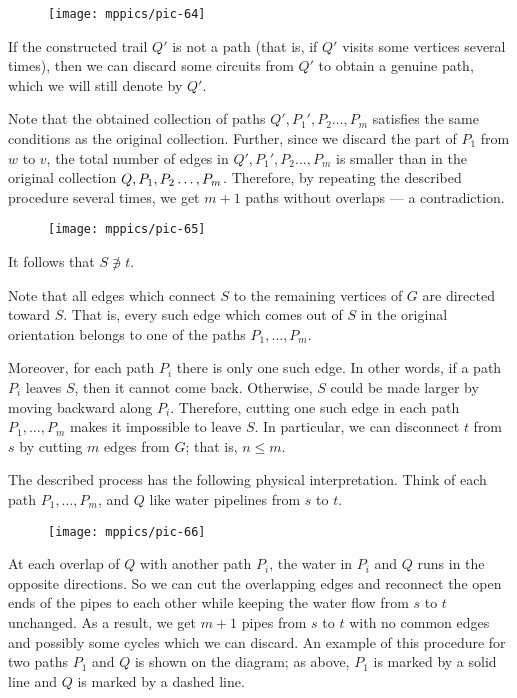 \begin{wrapfigure}{o}{30 mm}
\vskip-0mm
\centering
\texttt{[image: mppics/pic-64]}
\vskip0mm
\end{wrapfigure}
If the constructed trail $Q'$ is not a path (that is, if $Q'$ visits some vertices several times), then we can discard some circuits from $Q'$ to obtain a genuine path, 
which we will still denote by $Q'$.

Note that the obtained collection of paths $Q', P_1',P_2\dots,P_m$ satisfies the same conditions as the original collection.
Further, since we discard the part of $P_1$ from $w$ to $v$, the total number of edges in $Q', P_1',P_2\dots,P_m$
is smaller than in the original collection $Q, P_1,P_2\dots,P_m$.
Therefore, by repeating the described procedure several times, we get $m+1$ paths without overlaps --- a contradiction.

{

\begin{wrapfigure}{r}{40 mm}
\vskip-2mm
\centering
\texttt{[image: mppics/pic-65]}
\vskip0mm
\end{wrapfigure}

It follows that $S\not\ni t$.

Note that all edges which connect $S$ to the remaining vertices of $G$ are directed toward $S$.
That is, every such edge which comes out of $S$ in the original orientation belongs to one of the paths $P_1,\dots,P_m$.

Moreover, for each path $P_i$ there is only one such edge.
In other words, if a path $P_i$ leaves $S$, then it cannot come back. 
Otherwise, $S$ could be made larger by moving backward along $P_i$.
Therefore, cutting one such edge in each path $P_1,\dots,P_m$ makes it impossible to leave $S$.
In particular, we can disconnect $t$ from $s$ by cutting $m$ edges from $G$; that is, $n\le m$.
\qeds

}

The described process has the following physical interpretation.
Think of each path $P_1,\dots,P_m$, and $Q$ like water pipelines from $s$ to $t$.
\begin{figure}[ht!]%
\vskip0mm
\centering
\texttt{[image: mppics/pic-66]}
\vskip0mm
\end{figure}
At each overlap of $Q$ with another path $P_i$, the water in $P_i$ and $Q$ runs in the opposite directions.
So we can cut the overlapping edges and reconnect the open ends of the pipes to each other while keeping the water flow from $s$ to $t$ unchanged.
As a result, we get $m+1$ pipes from $s$ to $t$ with no common edges and possibly some cycles which we can discard.
An example of this procedure for two paths $P_1$ and $Q$ is shown on the diagram;
as above, $P_1$ is marked by a solid line and $Q$ is marked by a dashed line.

